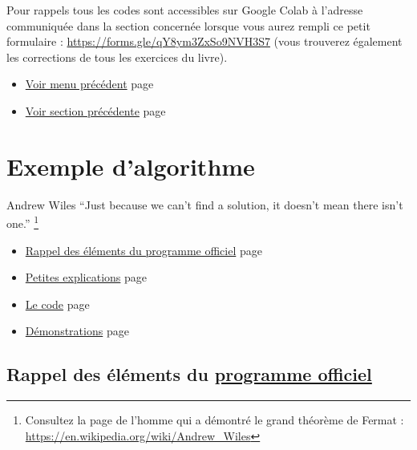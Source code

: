 \documentclass[a4paper,11pt]{book}
\begin{document}
\newpage

Pour rappels tous les codes sont accessibles sur Google Colab à
l'adresse communiquée dans la section concernée lorsque vous
aurez rempli ce petit formulaire : \url{https://forms.gle/qY8ym3ZxSo9NVH3S7}
(vous trouverez également les corrections de tous les exercices du
livre).


\begin{itemize}
\item \hyperref[orgfe369e8]{Voir menu précédent}
page~\pageref{page:proof1-menu}
\item \hyperref[orga226baf]{Voir section précédente}
page~\pageref{page:sec4.2.1hand}
\end{itemize}


\clearpage

\part{Exemple d'algorithme}
\label{sec:org272a3cb}
\label{org091b4be}
\label{page:sec5algo}

\begin{myquote}{Andrew Wiles}
\enquote{Just because we can’t find a solution, it doesn’t mean there isn’t
one.}
\footnote{Consultez la page de l'homme qui a démontré le grand théorème de Fermat : \url{https://en.wikipedia.org/wiki/Andrew_Wiles}}
\end{myquote}

\clearpage


\label{org3aca2a1}
\label{page:algos-menu}
\begin{itemize}
\item \hyperref[org06c5a30]{Rappel des éléments du programme officiel} page \pageref{page:sec5.1review}
\item \hyperref[org25f4c17]{Petites explications} page \pageref{page:sec5.2explain}
\item \hyperref[orgb14e38d]{Le code} page \pageref{page:sec5.3code}
\item \hyperref[org08a4120]{Démonstrations} page \pageref{page:sec4proofs}
\end{itemize}


\clearpage

\chapter{Rappel des éléments du \href{https://eduscol.education.fr/document/24553/download}{programme officiel}}
\label{sec:orgf010f67}
\label{org06c5a30}
\label{page:sec5.1review}
\end{document}
